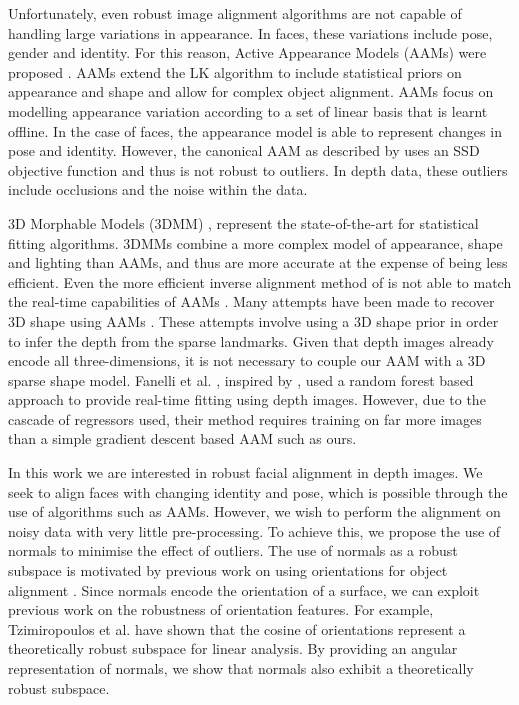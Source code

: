 Unfortunately, even robust image alignment algorithms are not capable of handling large variations in appearance. In faces, these variations include pose, gender and identity. For this reason, Active Appearance Models (AAMs) were proposed \cite{RefWorks:95,RefWorks:227}. AAMs extend the LK algorithm to include statistical priors on appearance and shape and allow for complex object alignment. AAMs focus on modelling appearance variation according to a set of linear basis that is learnt offline. In the case of faces, the appearance model is able to represent changes in pose and identity. However, the canonical AAM as described by \cite{RefWorks:95} uses an SSD objective function and thus is not robust to outliers. In depth data, these outliers include occlusions and the noise within the data.

3D Morphable Models (3DMM) \cite{RefWorks:96}, represent the state-of-the-art for statistical fitting algorithms. 3DMMs combine a more complex model of appearance, shape and lighting than AAMs, and thus are more accurate at the expense of being less efficient. Even the more efficient inverse alignment method of \cite{RefWorks:275} is not able to match the real-time capabilities of AAMs \cite{RefWorks:233, RefWorks:236}. Many attempts have been made to recover 3D shape using AAMs \cite{RefWorks:233, RefWorks:236, RefWorks:258, RefWorks:257}. These attempts involve using a 3D shape prior in order to infer the depth from the sparse landmarks. Given that depth images already encode all three-dimensions, it is not necessary to couple our AAM with a 3D sparse shape model. Fanelli et al. \cite{RefWorks:236}, inspired by \cite{RefWorks:276}, used a random forest based approach to provide real-time fitting using depth images. However, due to the cascade of regressors used, their method requires training on far more images than a simple gradient descent based AAM such as ours.

In this work we are interested in robust facial alignment in depth images. We seek to align faces with changing identity and pose, which is possible through the use of algorithms such as AAMs. However, we wish to perform the alignment on noisy data with very little pre-processing. To achieve this, we propose the use of normals to minimise the effect of outliers. The use of normals as a robust subspace is motivated by previous work on using orientations for object alignment \cite{RefWorks:273, RefWorks:6, RefWorks:272}. Since normals encode the orientation of a surface, we can exploit previous work on the robustness of orientation features. For example, Tzimiropoulos et al. \cite{RefWorks:5} have shown that the cosine of orientations represent a theoretically robust subspace for linear analysis. By providing an angular representation of normals, we show that normals also exhibit a theoretically robust subspace.

